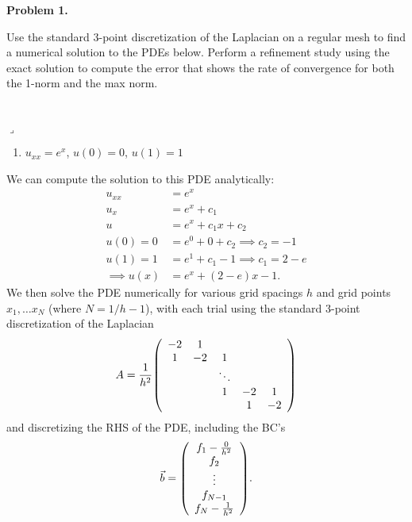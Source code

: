 \documentclass[12pt]{article}
\newenvironment{myprob}[1]
    {%
    \noindent{\Huge$\ulcorner$}\textbf{#1.}\begin{em}
    }
    { 
    \end{em} \\ \hphantom{l} \hfill {\Huge$\lrcorner$} }
\begin{document}
\rhead{\today}

{\let\newpage\relax} 


\begin{myprob}{Problem 1}
Use the standard 3-point discretization of the Laplacian on a regular mesh to find a numerical
solution to the PDEs below. Perform a refinement study using the exact solution to compute
the error that shows the rate of convergence for both the 1-norm and the max norm.
\end{myprob}
\begin{enumerate}[ \ \ (a)]
\item $u_{xx} = e^{x}$, $u(0)=0$, $u(1)=1$
\end{enumerate}
We can compute the solution to this PDE analytically:
\begin{align*}
u_{xx} &= e^{x}\\
u_x &= e^{x} + c_1 \\
u &= e^{x} +c_1 x + c_2 \\
u(0)=0 &= e^{0} + 0 + c_2 \implies c_2 = -1 \\
u(1) = 1 &= e^{1} + c_1 -1 \implies c_1 = 2-e\\
\implies u(x) &= e^{x} + (2-e)x -1 .
\end{align*}
We then solve the PDE numerically for various grid spacings $h$ and grid points $x_1, \dots x_N$ (where $N=1/h - 1$), with each trial using the standard 3-point discretization of the Laplacian
 \begin{align*}
            A = \frac{1}{h^2}\qty(\begin{array}{ccccc}
                -2 & 1 & & & \\
                1 & -2 & 1 & \\
                & & \ddots & & \\
                & & 1 & -2 & 1 \\
                & & & 1 & -2
            \end{array})
  \end{align*}
and discretizing the RHS of the PDE, including the BC's
        \begin{align*}
            \vec{b} = \qty(\begin{array}{c}
                f_1 - \frac{0}{h^2} \\ f_2 \\ \vdots \\ f_{N-1} \\ f_N - \frac{1}{h^2}
            \end{array}).
        \end{align*}
\end{document}
